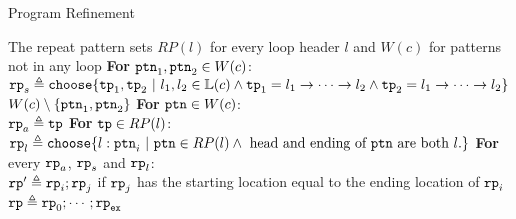 \begin{algorithm}
\caption{
{Program Refinement}
\label{alg:prog_refine}
}
\begin{algorithmic}[1]
\REQUIRE The repeat pattern sets $RP(l)$ for every loop header $l$ and $W(c)$ for patterns not in any loop
\STATE  \textbf{For} $\mathtt{ptn}_1, \mathtt{ptn}_2 \in W(c)$:
\\ \quad 
$\rprog_{s} \triangleq 
  \rpchoose{
  \tpath_1, \tpath_2 ~|~ l_1, l_2 \in \lvar(c) \land 
  \tpath_1 = l_1 \to \cdots \to l_2 \land \tpath_2 = l_1 \to \cdots \to l_2
  }
$
\\ \quad 
$ W(c) \setminus \{\mathtt{ptn}_1, \mathtt{ptn}_2\} $
\STATE  \textbf{For} $\mathtt{ptn}\in W(c)$:
\\ \quad 
$\mathtt{rp}_{a} \triangleq  \mathtt{tp}$
\STATE \textbf{For} $\mathtt{tp} \in RP(l)$:
\\ \quad
$\rprog_l \triangleq 
\rpchoose{
 l: \rpattern_{i} ~|~ \rpattern \in RP(l) \land \text{ head and ending of } \rpattern \text{ are both } l.
}$
\STATE \textbf{For} every $\mathtt{rp}_a$, $\mathtt{rp}_{s}$ and $\mathtt{rp}_l$:
\\ \quad
$\mathtt{rp}' \triangleq \mathtt{rp}_i; \mathtt{rp}_{j}$
 if $\mathtt{rp}_{j}$ has the starting location equal to the ending location of $\mathtt{rp}_i$
\RETURN $\mathtt{rp} \triangleq \mathtt{rp}_0; \cdots; \mathtt{rp}_{\mathtt{ex}}$
\end{algorithmic}
\end{algorithm}
%

%
